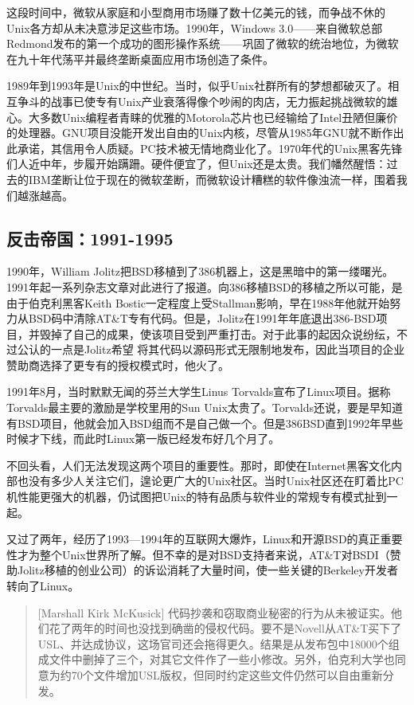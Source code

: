 \documentclass[12pt,oneside]{ctexbook}
\begin{document}
\begin{common-format}
这段时间中，微软从家庭和小型商用市场赚了数十亿美元的钱，而争战不休的Unix各方却从未决意涉足这些市场。1990年，Windows 3.0——来自微软总部Redmond发布的第一个成功的图形操作系统——巩固了微软的统治地位，为微软在九十年代荡平并最终垄断桌面应用市场创造了条件。

1989年到1993年是Unix的中世纪。当时，似乎Unix社群所有的梦想都破灭了。相互争斗的战事已使专有Unix产业衰落得像个吵闹的肉店，无力振起挑战微软的雄心。大多数Unix编程者青睐的优雅的Motorola芯片也已经输给了Intel丑陋但廉价的处理器。GNU项目没能开发出自由的Unix内核，尽管从1985年GNU就不断作出此承诺，其信用令人质疑。PC技术被无情地商业化了。1970年代的Unix黑客先锋们人近中年，步履开始蹒跚。硬件便宜了，但Unix还是太贵。我们幡然醒悟：过去的IBM垄断让位于现在的微软垄断，而微软设计糟糕的软件像浊流一样，围着我们越涨越高。

\subsection{反击帝国：1991-1995}
1990年，William Jolitz把BSD移植到了386机器上，这是黑暗中的第一缕曙光。1991年起一系列杂志文章对此进行了报道。向386移植BSD的移植之所以可能，是由于伯克利黑客Keith Bostic一定程度上受Stallman影响，早在1988年他就开始努力从BSD码中清除AT\&{}T专有代码。但是，Jolitz在1991年年底退出386-BSD项目，并毁掉了自己的成果，使该项目受到严重打击。对于此事的起因众说纷纭，不过公认的一点是Jolitz希望
将其代码以源码形式无限制地发布，因此当项目的企业赞助商选择了更专有的授权模式时，他火了。

1991年8月，当时默默无闻的芬兰大学生Linus Torvalds宣布了Linux项目。据称Torvalds最主要的激励是学校里用的Sun Unix太贵了。Torvalds还说，要是早知道有BSD项目，他就会加入BSD组而不是自己做一个。但是386BSD直到1992年早些时候才下线，而此时Linux第一版已经发布好几个月了。

不回头看，人们无法发现这两个项目的重要性。那时，即使在Internet黑客文化内部也没有多少人关注它们，遑论更广大的Unix社区。当时Unix社区还在盯着比PC机性能更强大的机器，仍试图把Unix的特有品质与软件业的常规专有模式扯到一起。

又过了两年，经历了1993—1994年的互联网大爆炸，Linux和开源BSD的真正重要性才为整个Unix世界所了解。但不幸的是对BSD支持者来说，AT\&{}T对BSDI（赞助Jolitz移植的创业公司）的诉讼消耗了大量时间，使一些关键的Berkeley开发者转向了Linux。

\begin{quote}[Marshall Kirk McKusick]
代码抄袭和窃取商业秘密的行为从未被证实。他们花了两年的时间也没找到确凿的侵权代码。要不是Novell从AT\&{}T买下了USL、并达成协议，这场官司还会拖得更久。结果是从发布包中18000个组成文件中删掉了三个，对其它文件作了一些小修改。另外，伯克利大学也同意为约70个文件增加USL版权，但同时约定这些文件仍然可以自由重新分发。
\end{quote}


\end{common-format}
\end{document}
